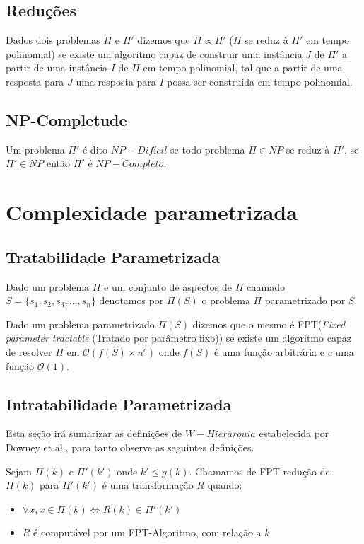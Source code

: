 \subsection{Reduções}
Dados dois problemas $\Pi$ e $\Pi'$ dizemos que $\Pi \propto \Pi'$ ($\Pi$ se reduz à $\Pi'$ em tempo polinomial) se existe um algoritmo capaz de construir uma instância $J$ de $\Pi'$ a partir de uma instância $I$ de $\Pi$ em tempo polinomial, tal que a partir de uma resposta para $J$ uma resposta para $I$ possa ser construída em tempo polinomial. 

\subsection{NP-Completude}
Um problema $\Pi'$ é dito $NP-Difícil$ se todo problema $\Pi \in NP$ se reduz à $\Pi'$, se $\Pi' \in NP$ então $\Pi'$ é $NP-Completo$.

\section{Complexidade parametrizada}

\subsection{Tratabilidade Parametrizada}
\begin{definition}
Dado um problema $\Pi$ e um conjunto de aspectos de $\Pi$ chamado $S = \{s_1,s_2,s_3,...,s_n\}$ denotamos por $\Pi(S)$ o problema $\Pi$ parametrizado por $S$.
\end{definition}
\begin{definition}
Dado um problema parametrizado $\Pi(S)$ dizemos que o mesmo é FPT(\emph{Fixed parameter tractable} (Tratado por parâmetro fixo)) se existe um algoritmo capaz de resolver $\Pi$ em $\mathcal{O}(f(S)\times n^c)$ onde $f(S)$ é uma função arbitrária e $c$ uma função $\mathcal{O}(1)$.
\end{definition}

\subsection{Intratabilidade Parametrizada}
Esta seção irá sumarizar as definições de $W-Hierarquia$ estabelecida por Downey et al.\cite{downey98}, para tanto observe as seguintes definições.
\begin{definition}
 Sejam $\Pi(k)$ e $\Pi'(k')$ onde $k' \leq g(k)$. Chamamos de FPT-redução de $\Pi(k)$ para $\Pi'(k')$ é uma transformação $R$ quando:
 \begin{itemize}
   \item $\forall x, x \in \Pi(k) \iff R(k) \in \Pi'(k')$
   \item $R$ é computável por um FPT-Algoritmo, com relação a $k$
 \end{itemize}
\end{definition}

